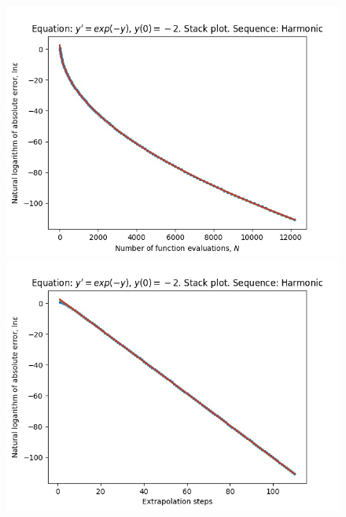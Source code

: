 \begin{figure}[H]
\centering
\begin{minipage}{0.45\textwidth}
\centering
\includegraphics[scale=0.45]{../results/emr_plots/ln_em2_hp_harmonic_stack.png}
\end{minipage}
\begin{minipage}{0.45\textwidth}
\centering
\includegraphics[scale=0.45]{../results/emr_plots/ln_em2_hp_harmonic_steps_stack.png}
\end{minipage}
\end{figure}

